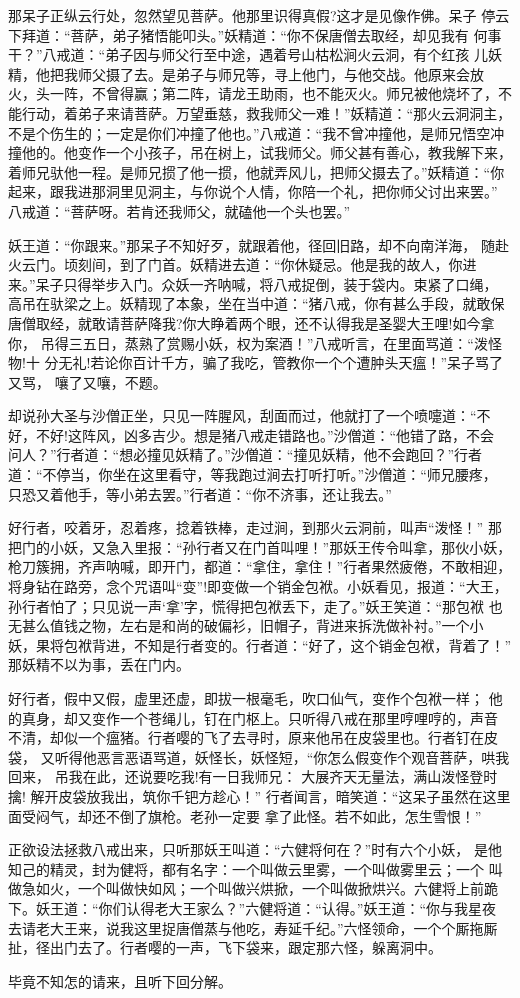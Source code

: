 那呆子正纵云行处，忽然望见菩萨。他那里识得真假?这才是见像作佛。呆子
停云下拜道：“菩萨，弟子猪悟能叩头。”妖精道：“你不保唐僧去取经，却见我有
何事干？”八戒道：“弟子因与师父行至中途，遇着号山枯松涧火云洞，有个红孩
儿妖精，他把我师父摄了去。是弟子与师兄等，寻上他门，与他交战。他原来会放
火，头一阵，不曾得赢；第二阵，请龙王助雨，也不能灭火。师兄被他烧坏了，不
能行动，着弟子来请菩萨。万望垂慈，救我师父一难！”妖精道：“那火云洞洞主，
不是个伤生的；一定是你们冲撞了他也。”八戒道：“我不曾冲撞他，是师兄悟空冲
撞他的。他变作一个小孩子，吊在树上，试我师父。师父甚有善心，教我解下来，
着师兄驮他一程。是师兄掼了他一掼，他就弄风儿，把师父摄去了。”妖精道：“你
起来，跟我进那洞里见洞主，与你说个人情，你陪一个礼，把你师父讨出来罢。”
八戒道：“菩萨呀。若肯还我师父，就磕他一个头也罢。”

妖王道：“你跟来。”那呆子不知好歹，就跟着他，径回旧路，却不向南洋海，
随赴火云门。顷刻间，到了门首。妖精进去道：“你休疑忌。他是我的故人，你进
来。”呆子只得举步入门。众妖一齐呐喊，将八戒捉倒，装于袋内。束紧了口绳，
高吊在驮梁之上。妖精现了本象，坐在当中道：“猪八戒，你有甚么手段，就敢保
唐僧取经，就敢请菩萨降我?你大睁着两个眼，还不认得我是圣婴大王哩!如今拿你，
吊得三五日，蒸熟了赏赐小妖，权为案酒！”八戒听言，在里面骂道：“泼怪物!十
分无礼!若论你百计千方，骗了我吃，管教你一个个遭肿头天瘟！”呆子骂了又骂，
嚷了又嚷，不题。

却说孙大圣与沙僧正坐，只见一阵腥风，刮面而过，他就打了一个喷嚏道：“不
好，不好!这阵风，凶多吉少。想是猪八戒走错路也。”沙僧道：“他错了路，不会
问人？”行者道：“想必撞见妖精了。”沙僧道：“撞见妖精，他不会跑回？”行者
道：“不停当，你坐在这里看守，等我跑过涧去打听打听。”沙僧道：“师兄腰疼，
只恐又着他手，等小弟去罢。”行者道：“你不济事，还让我去。”

好行者，咬着牙，忍着疼，捻着铁棒，走过涧，到那火云洞前，叫声“泼怪！”
那把门的小妖，又急入里报：“孙行者又在门首叫哩！”那妖王传令叫拿，那伙小妖，
枪刀簇拥，齐声呐喊，即开门，都道：“拿住，拿住！”行者果然疲倦，不敢相迎，
将身钻在路旁，念个咒语叫“变”!即变做一个销金包袱。小妖看见，报道：“大王，
孙行者怕了；只见说一声‘拿’字，慌得把包袱丢下，走了。”妖王笑道：“那包袱
也无甚么值钱之物，左右是和尚的破偏衫，旧帽子，背进来拆洗做补衬。”一个小
妖，果将包袱背进，不知是行者变的。行者道：“好了，这个销金包袱，背着了！”
那妖精不以为事，丢在门内。

好行者，假中又假，虚里还虚，即拔一根毫毛，吹口仙气，变作个包袱一样；
他的真身，却又变作一个苍绳儿，钉在门枢上。只听得八戒在那里哼哩哼的，声音
不清，却似一个瘟猪。行者嘤的飞了去寻时，原来他吊在皮袋里也。行者钉在皮袋，
又听得他恶言恶语骂道，妖怪长，妖怪短，“你怎么假变作个观音菩萨，哄我回来，
吊我在此，还说要吃我!有一日我师兄：
大展齐天无量法，满山泼怪登时擒!
解开皮袋放我出，筑你千钯方趁心！”
行者闻言，暗笑道：“这呆子虽然在这里面受闷气，却还不倒了旗枪。老孙一定要
拿了此怪。若不如此，怎生雪恨！”

正欲设法拯救八戒出来，只听那妖王叫道：“六健将何在？”时有六个小妖，
是他知己的精灵，封为健将，都有名字：一个叫做云里雾，一个叫做雾里云；一个
叫做急如火，一个叫做快如风；一个叫做兴烘掀，一个叫做掀烘兴。六健将上前跪
下。妖王道：“你们认得老大王家么？”六健将道：“认得。”妖王道：“你与我星夜
去请老大王来，说我这里捉唐僧蒸与他吃，寿延千纪。”六怪领命，一个个厮拖厮
扯，径出门去了。行者嘤的一声，飞下袋来，跟定那六怪，躲离洞中。

毕竟不知怎的请来，且听下回分解。